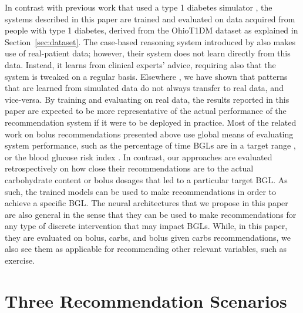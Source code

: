 \documentclass[journal,article,submit,moreauthors,pdftex]{Definitions/mdpi}
\begin{document}
In contrast with previous work that used a type 1 diabetes simulator \cite{cappon:jdst18,sun:jbhi19,zhu:bolus_drl}, the systems described in this paper are trained and evaluated on data acquired from people with type 1 diabetes, derived from the OhioT1DM dataset \cite{ohiot1dm:marling:kdh18} as explained in Section~\ref{sec:dataset}. The case-based reasoning system introduced by \citet{pesl:case_based} also makes use of real-patient data; however, their system does not learn directly from this data. Instead, it learns from clinical experts' advice, requiring also that the system is tweaked on a regular basis. Elsewhere \cite{mirshekarian:embc19}, we have shown that patterns that are learned from simulated data do not always transfer to real data, and vice-versa. By training and evaluating on real data, the results reported in this paper are expected to be more representative of the actual performance of the recommendation system if it were to be deployed in practice. Most of the related work on bolus recommendations presented above use global means of evaluating system performance, such as the percentage of time BGLs are in a target range \cite{sun:jbhi19,zhu:bolus_drl}, or the blood glucose risk index \cite{cappon:jdst18}. In contrast, our approaches are evaluated retrospectively on how close their recommendations are to the actual carbohydrate content or bolus dosages that led to a particular target BGL. As such, the trained models can be used to make recommendations in order to achieve a specific BGL. The neural architectures that we propose in this paper are also general in the sense that they can be used to make recommendations for any type of discrete intervention that may impact BGLs. While, in this paper, they are evaluated on bolus, carbs, and bolus given carbs recommendations, we also see them as applicable for recommending other relevant variables, such as exercise.





\section{Three Recommendation Scenarios}
\label{sec:scenarios}
\end{document}
